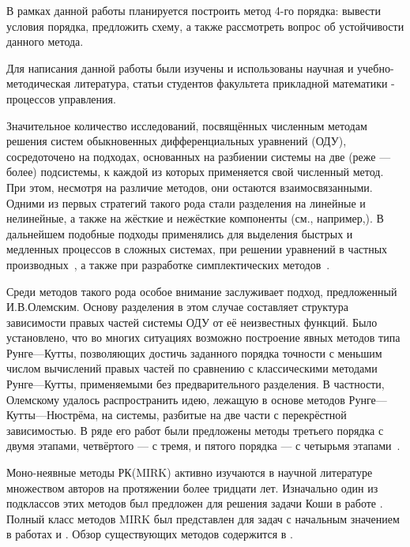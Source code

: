 \documentclass[a4paper,article,14pt]{extarticle}
\begin{document}
В рамках данной работы планируется построить метод 4-го порядка: вывести условия порядка, предложить схему, а также рассмотреть вопрос об устойчивости данного метода. 
\pagebreak

Для написания данной работы были изучены и использованы научная и учебно-методическая литература, статьи студентов факультета прикладной математики - процессов управления.

Значительное количество исследований, посвящённых численным методам решения систем обыкновенных дифференциальных уравнений (ОДУ), сосредоточено на подходах, основанных на разбиении системы на две (реже — более) подсистемы, к каждой из которых применяется свой численный метод. При этом, несмотря на различие методов, они остаются взаимосвязанными. Одними из первых стратегий такого рода стали разделения на линейные и нелинейные, а также на жёсткие и нежёсткие компоненты (см., например,\cite{Hofer1976}). В дальнейшем подобные подходы применялись для выделения быстрых и медленных процессов в сложных системах\cite{ShomeEtAl2004, SanduGuenther2016}, при решении уравнений в частных производных~\cite{KetchesonEtAl2016}, а также при разработке симплектических методов~\cite{KalogiratouEtAl2011}.

Среди методов такого рода особое внимание заслуживает подход, предложенный И.В.Олемским. Основу разделения в этом случае составляет структура зависимости правых частей системы ОДУ от её неизвестных функций. Было установлено, что во многих ситуациях возможно построение явных методов типа Рунге—Кутты, позволяющих достичь заданного порядка точности с меньшим числом вычислений правых частей по сравнению с классическими методами Рунге—Кутты, применяемыми без предварительного разделения. В частности, Олемскому удалось распространить идею, лежащую в основе методов Рунге—Кутты—Нюстрёма\cite{tree}, на системы, разбитые на две части с перекрёстной зависимостью. В ряде его работ были предложены методы третьего порядка с двумя этапами, четвёртого — с тремя\cite{Olemskoy2003}, и пятого порядка — с четырьмя этапами~\cite{Olemskoy2002}.

Моно-неявные методы РК(MIRK) активно изучаются в научной литературе множеством авторов на протяжении более тридцати лет. Изначально один из подклассов этих методов был предложен для решения задачи Коши в работе \cite{Cash1975}. Полный класс методов MIRK был представлен для задач с начальным значением в работах \cite{Bokhoven1980} и \cite{Cash1982}. Обзор существующих методов содержится в \cite{Muir1987}.
\end{document}
